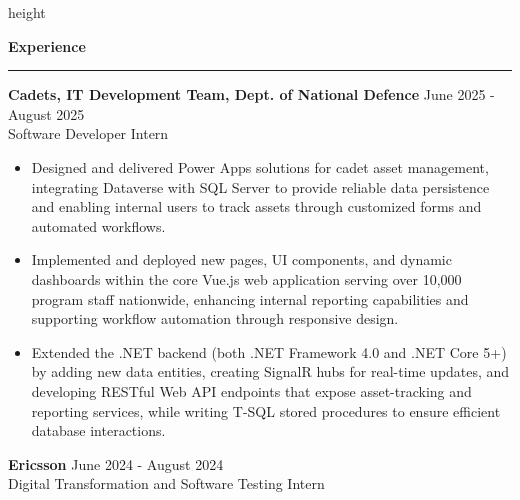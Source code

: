 \documentclass[10pt]{article}
\newcommand{\cvsection}[1]{
  \vspace{6pt}
  {\large\bf #1}
  \vspace{2pt}
  \hrule
  \vspace{5pt}
}
\newcommand{\tagged}[2]{\hypertarget{#1}{#2}}
\begin{document}
\hspace{4pt}%
\textcolor{linecolor}{\vrule width 0.4pt height \textheight}%
\hspace{8pt}%
\begin{minipage}[t]{0.65\textwidth}
\vspace{0pt}

\cvsection{Experience}

{\fontsize{10}{13}\bf \tagged{8efb0172_company}{Cadets, IT Development Team, Dept. of National Defence}} \hfill {\fontsize{8.5}{11}\selectfont \tagged{8efb0172_date}{June 2025 - August 2025}} \\[-1pt]
{\fontsize{9}{12}\selectfont \tagged{8efb0172_title}{Software Developer Intern}} \hfill {\fontsize{8.5}{11}\selectfont\textit{\tagged{8efb0172_location}{}}}
\vspace{1pt}
{\fontsize{8.5}{12}\selectfont
\begin{itemize}[leftmargin=1.2em, noitemsep, topsep=1pt, parsep=0pt]

  \item \tagged{experience_8efb0172_b1}{Designed and delivered Power Apps solutions for cadet asset management, integrating Dataverse with SQL Server to provide reliable data persistence and enabling internal users to track assets through customized forms and automated workflows.}

  \item \tagged{experience_8efb0172_b2}{Implemented and deployed new pages, UI components, and dynamic dashboards within the core Vue.js web application serving over 10,000 program staff nationwide, enhancing internal reporting capabilities and supporting workflow automation through responsive design.}

  \item \tagged{experience_8efb0172_b3}{Extended the .NET backend (both .NET Framework 4.0 and .NET Core 5+) by adding new data entities, creating SignalR hubs for real-time updates, and developing RESTful Web API endpoints that expose asset-tracking and reporting services, while writing T-SQL stored procedures to ensure efficient database interactions.}

\end{itemize}
}
\vspace{5pt}

{\fontsize{10}{13}\bf \tagged{4537e570_company}{Ericsson}} \hfill {\fontsize{8.5}{11}\selectfont \tagged{4537e570_date}{June 2024 - August 2024}} \\[-1pt]
{\fontsize{9}{12}\selectfont \tagged{4537e570_title}{Digital Transformation and Software Testing Intern}} \hfill {\fontsize{8.5}{11}\selectfont\textit{\tagged{4537e570_location}{}}}
\vspace{1pt}
{\fontsize{8.5}{12}\selectfont
\begin{itemize}[leftmargin=1.2em, noitemsep, topsep=1pt, parsep=0pt]


\end{itemize}}
\end{minipage}
\end{document}
